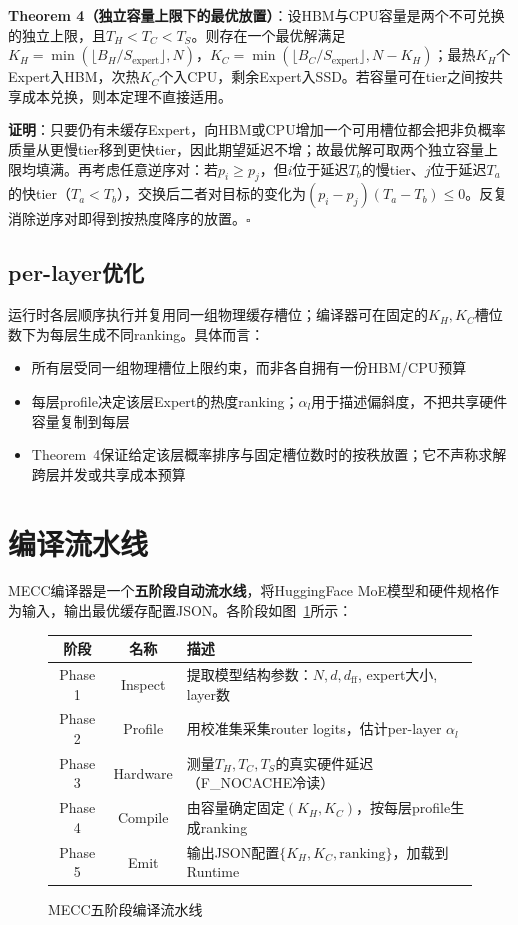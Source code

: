 \documentclass[11pt,a4paper]{article}
\begin{document}
\textbf{Theorem 4（独立容量上限下的最优放置）}：设HBM与CPU容量是两个不可兑换的独立上限，且$T_H<T_C<T_S$。则存在一个最优解满足$K_H = \min(\lfloor B_H/S_{\text{expert}}\rfloor, N)$，$K_C = \min(\lfloor B_C/S_{\text{expert}}\rfloor, N-K_H)$；最热$K_H$个Expert入HBM，次热$K_C$个入CPU，剩余Expert入SSD。若容量可在tier之间按共享成本兑换，则本定理不直接适用。

\textbf{证明}：只要仍有未缓存Expert，向HBM或CPU增加一个可用槽位都会把非负概率质量从更慢tier移到更快tier，因此期望延迟不增；故最优解可取两个独立容量上限均填满。再考虑任意逆序对：若$p_i\ge p_j$，但$i$位于延迟$T_b$的慢tier、$j$位于延迟$T_a$的快tier（$T_a<T_b$），交换后二者对目标的变化为$(p_i-p_j)(T_a-T_b)\le0$。反复消除逆序对即得到按热度降序的放置。$\square$

\subsection{per-layer优化}

运行时各层顺序执行并复用同一组物理缓存槽位；编译器可在固定的$K_H,K_C$槽位数下为每层生成不同ranking。具体而言：
\begin{itemize}
    \item 所有层受同一组物理槽位上限约束，而非各自拥有一份HBM/CPU预算
    \item 每层profile决定该层Expert的热度ranking；$\alpha_l$用于描述偏斜度，不把共享硬件容量复制到每层
    \item Theorem~4保证给定该层概率排序与固定槽位数时的按秩放置；它不声称求解跨层并发或共享成本预算
\end{itemize}

\section{编译流水线}

MECC编译器是一个\textbf{五阶段自动流水线}，将HuggingFace MoE模型和硬件规格作为输入，输出最优缓存配置JSON。各阶段如图~\ref{fig:pipeline}所示：

\begin{figure}[!h]
\centering
\begin{tabular}{|c|c|l|}
\hline
\textbf{阶段} & \textbf{名称} & \textbf{描述} \\
\hline
Phase 1 & Inspect & 提取模型结构参数：$N, d, d_{\text{ff}}$, expert大小, layer数 \\
Phase 2 & Profile & 用校准集采集router logits，估计per-layer $\alpha_l$ \\
Phase 3 & Hardware & 测量$T_H, T_C, T_S$的真实硬件延迟（F\_NOCACHE冷读） \\
Phase 4 & Compile & 由容量确定固定$(K_H,K_C)$，按每层profile生成ranking \\
Phase 5 & Emit & 输出JSON配置$\{K_H, K_C, \text{ranking}\}$，加载到Runtime \\
\hline
\end{tabular}
\caption{MECC五阶段编译流水线}
\label{fig:pipeline}
\end{figure}
\end{document}
